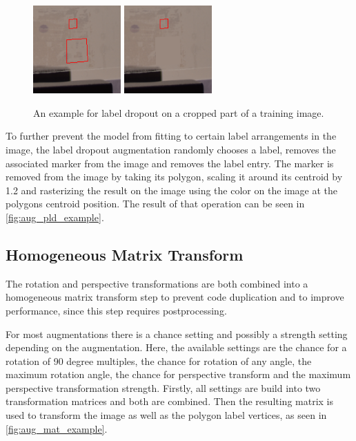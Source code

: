 \documentclass[10pt]{book}
\newcommand{\figureref}[1]{\autoref{#1}}
\begin{document}
\begin{figure}
  \centering
     {\includegraphics[width=0.3\textwidth]{image/aug_pld_before}}
     {\includegraphics[width=0.3\textwidth]{image/aug_pld_after}}
  \caption{An example for label dropout on a cropped part of a training image.}
  \label{fig:aug_pld_example}
\end{figure}

To further prevent the model from fitting to certain label arrangements in the image, the label dropout augmentation randomly chooses a label, removes the associated marker from the image and removes the label entry. The marker is removed from the image by taking its polygon, scaling it around its centroid by 1.2 and rasterizing the result on the image using the color on the image at the polygons centroid position. The result of that operation can be seen in \figureref{fig:aug_pld_example}.

\subsection{Homogeneous Matrix Transform}

The rotation and perspective transformations are both combined into a homogeneous matrix transform step to prevent code duplication and to improve performance, since this step requires postprocessing.

For most augmentations there is a chance setting and possibly a strength setting depending on the augmentation. Here, the available settings are the chance for a rotation of 90 degree multiples, the chance for rotation of any angle, the maximum rotation angle, the chance for perspective transform and the maximum perspective transformation strength. Firstly, all settings are build into two transformation matrices and both are combined. Then the resulting matrix is used to transform the image as well as the polygon label vertices, as seen in \figureref{fig:aug_mat_example}.
\end{document}
